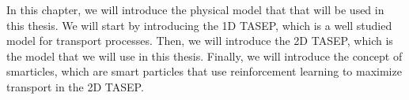 


In this chapter, we will introduce the physical model that that will be used in this thesis. We will start by introducing the 1D TASEP, which is a well studied model for transport processes. Then, we will introduce the 2D TASEP, which is the model that we will use in this thesis. Finally, we will introduce the concept of smarticles, which are smart particles that use reinforcement learning to maximize transport in the 2D TASEP.

